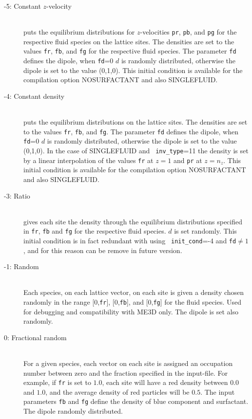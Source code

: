 \documentclass[a4paper]{article}
\begin{document}
\begin{description}
\item[-5: Constant $z$-velocity]\ \\
  puts the equilibrium distributions for $z$-velocities {\tt pr}, {\tt pb},
  and {\tt pg} for the respective fluid species on the lattice sites. The
  densities are set to the values {\tt fr}, {\tt fb}, and {\tt fg} for the
  respective fluid species. The parameter {\tt fd} defines the dipole, when
  {\tt fd}=0 $d$ is randomly distributed, otherwise the dipole is set to the
  value (0,1,0). This initial condition is available for the compilation
  option NOSURFACTANT and also SINGLEFLUID.

\item[-4: Constant density]\ \\
  puts the equilibrium distributions on the lattice sites. The densities are
  set to the values {\tt fr}, {\tt fb}, and {\tt fg}. The parameter {\tt fd}
  defines the dipole, when {\tt fd}=0 $d$ is randomly distributed, otherwise
  the dipole is set to the value (0,1,0). In the case of SINGLEFLUID and {\tt
    inv\_type}=11 the density is set by a linear interpolation of the values
  {\tt fr} at $z=1$ and {\tt pr} at $z=n_{z}$. This initial condition is
  available for the compilation option NOSURFACTANT and also SINGLEFLUID.

\item[-3: Ratio]\ \\
  gives each site the density through the equilibrium distributions specified
  in {\tt fr}, {\tt fb} and {\tt fg} for the respective fluid species. $d$ is
  set randomly. This initial condition is in fact redundant with using {\tt
    init\_cond}=-4 and {\tt fd}$\neq 1$, and for this reason can be remove in
  future version.

\item[-1: Random]\ \\
  Each species, on each lattice vector, on each site is given a density chosen
  randomly in the range [0,{\tt fr}], [0,{\tt fb}], and [0,{\tt fg}] for the
  fluid species. Used for debugging and compatibility with ME3D only. The
  dipole is set also randomly. 

\item[0: Fractional random]\ \\
  For a given species, each vector on each site is assigned an occupation
  number between zero and the fraction specified in the input-file. For
  example, if {\tt fr} is set to $1.0$, each site will have a red density
  between $0.0$ and $1.0$, and the average density of red particles will be
  $0.5$. The input parameters {\tt fb} and {\tt fg} define the density of blue
  component and surfactant. The dipole randomly distributed.


\end{description}
\end{document}
